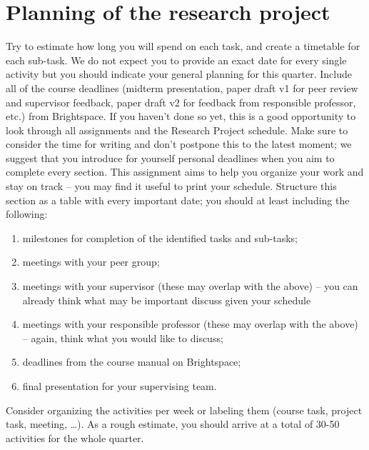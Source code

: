 \documentclass[english, a4paper]{article}
\begin{document}
\section*{Planning of the research project}
Try to estimate how long you will spend on each task, and create a timetable for each sub-task. We do not expect you to provide an exact date for every single activity but you should indicate your general planning for this quarter. Include all of the course deadlines (midterm presentation, paper draft v1 for peer review and supervisor feedback, paper draft v2 for feedback from responsible professor, etc.) from Brightspace. If you haven't done so yet, this is a good opportunity to look through all assignments and the Research Project schedule. Make sure to consider the time for writing and don't postpone this to the latest moment; we suggest that you introduce for yourself personal deadlines when you aim to complete every section. This assignment aims to help you organize your work and stay on track -- you may find it useful to print your schedule. Structure this section as a table with every important date; you should at least including the following:

\begin{enumerate}
\item milestones for completion of the identified tasks and sub-tasks;
\item meetings with your peer group;
\item meetings with your supervisor (these may overlap with the above) -- you can already think what may be important discuss given your schedule
\item meetings with your responsible professor (these may overlap with the above)  -- again, think what you would like to discuss;
\item deadlines from the course manual on Brightspace;
\item final presentation for your supervising team.
\end{enumerate}

\noindent Consider organizing the activities per week or labeling them (course task, project task, meeting, \ldots). As a rough estimate, you should arrive at a total of 30-50 activities for the whole quarter.

\printbibliography 
\end{document}
